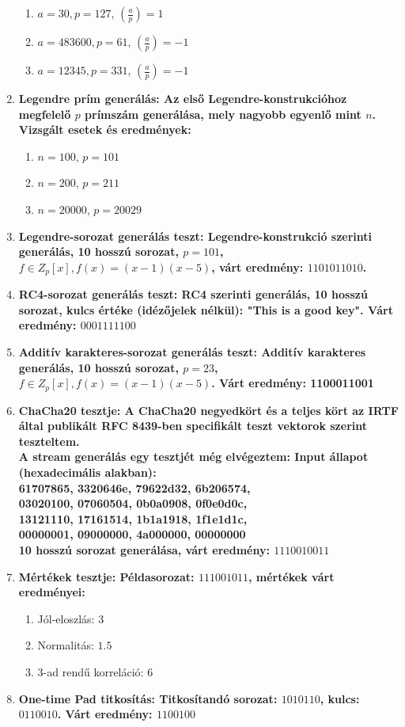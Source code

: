 \documentclass[12pt]{article}
\begin{document}
\begin{enumerate}
\begin{enumerate}
		\item $a = 30, p = 127$, $\left({\frac{a}{p}}\right) = 1$
		\item $a = 483600, p = 61$, $\left({\frac{a}{p}}\right) = -1$
		\item $a = 12345, p = 331$, $\left({\frac{a}{p}}\right) = -1$
	\end{enumerate}
	\item \bfseries Legendre prím generálás:
	\normalfont Az első Legendre-konstrukcióhoz megfelelő $p$ prímszám generálása, mely nagyobb egyenlő mint $n$. Vizsgált esetek és eredmények:
	\begin{enumerate}
		\item $n = 100$, $p = 101$
		\item $n = 200$, $p = 211$
		\item $n = 20000$, $p = 20029$
	\end{enumerate}
	\item  \bfseries Legendre-sorozat generálás teszt:
	\normalfont Legendre-konstrukció szerinti generálás, 10 hosszú sorozat, $p = 101$, $f \in Z_p[x], f(x) = (x-1)(x-5)$, várt eredmény:	$1101011010$.
	\item \bfseries RC4-sorozat generálás teszt:
	\normalfont RC4 szerinti generálás, 10 hosszú sorozat, kulcs értéke (idézőjelek nélkül): "This is a good key". Várt eredmény: $0001111100$
	\item \bfseries Additív karakteres-sorozat generálás teszt:
	\normalfont Additív karakteres generálás, 10 hosszú sorozat, $p = 23$, $f \in Z_p[x], f(x) = (x-1)(x-5)$. Várt eredmény: 1100011001
	\item \bfseries ChaCha20 tesztje:
	\normalfont  A ChaCha20 negyedkört és a teljes kört az IRTF által publikált RFC 8439-ben specifikált teszt vektorok szerint teszteltem.
	\\ A stream generálás egy tesztjét még elvégeztem:
	Input állapot (hexadecimális alakban): \\
	    61707865, 3320646e, 79622d32, 6b206574, \\
		03020100, 07060504, 0b0a0908, 0f0e0d0c, \\
		13121110, 17161514, 1b1a1918, 1f1e1d1c, \\
		00000001, 09000000, 4a000000, 00000000 \\
	10 hosszú sorozat generálása, várt eredmény: $1110010011$
	\item \bfseries Mértékek tesztje:
	\normalfont Példasorozat: $111001011$, mértékek várt eredményei:
	\begin{enumerate}
		\item Jól-eloszlás: $3$
		\item Normalitás: $1.5$
		\item 3-ad rendű korreláció: 6
	\end{enumerate}
\item \bfseries One-time Pad titkosítás:
\normalfont Titkosítandó sorozat: $1010110$, kulcs: $0110010$. Várt eredmény: $1100100$
\end{enumerate}
\end{document}
